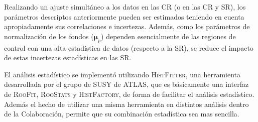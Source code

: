 Realizando un ajuste simultáneo a los datos en las CR (o en las CR y SR), los
parámetros descriptos anteriormente pueden ser estimados teniendo en cuenta
apropiadamente sus correlaciones e incertezas. Además, como los parámetros
de normalización de los fondos ($\bm{\mu}_p$) dependen esencialmente de las
regiones de control con una alta estadística de datos (respecto a la SR),
se reduce el impacto de estas incertezas estadísticas en las SR.


El análisis estadístico se implementó utilizando \textsc{HistFitter}\cite{HistFitter}, una herramienta
desarrollada por el grupo de SUSY de ATLAS, que es básicamente una interfaz de
\textsc{RooFit}, \textsc{RooStats}\cite{Moneta:2010pm} y
\textsc{HistFactory}\cite{Cranmer:1456844}, de forma de facilitar el análisis
estadístico. Además el hecho de utilizar una misma herramienta en distintos
análisis dentro de la Colaboración, permite que su combinación estadística sea mas
sencilla.










